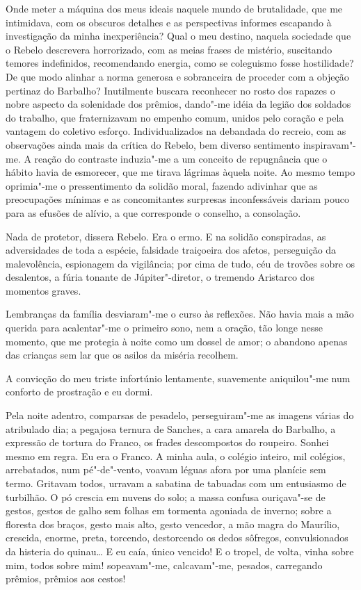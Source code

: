 Onde meter a máquina dos meus ideais naquele mundo de brutalidade, que me intimidava, 
com os obscuros detalhes e as perspectivas informes escapando à investigação da minha
inexperiência? Qual o meu destino, naquela sociedade que o Rebelo
descrevera horrorizado, com as meias frases de mistério, suscitando
temores indefinidos, recomendando energia, como se coleguismo fosse
hostilidade? De que modo alinhar a norma generosa e sobranceira de
proceder com a objeção pertinaz do Barbalho? Inutilmente buscara
reconhecer no rosto dos rapazes o nobre aspecto da solenidade dos
prêmios, dando"-me idéia da legião dos soldados do trabalho, que
fraternizavam no empenho comum, unidos pelo coração e pela vantagem do
coletivo esforço. Individualizados na debandada do recreio, com as
observações ainda mais da crítica do Rebelo, bem diverso sentimento
inspiravam"-me. A reação do contraste induzia"-me a um conceito de
repugnância que o hábito havia de esmorecer, que me tirava lágrimas
àquela noite. Ao mesmo tempo oprimia"-me o pressentimento da solidão
moral, fazendo adivinhar que as preocupações mínimas e as concomitantes
surpresas inconfessáveis dariam pouco para as efusões de alívio, a que
corresponde o conselho, a consolação. 

Nada de protetor, dissera Rebelo.
Era o ermo. E na solidão conspiradas, as adversidades de toda a
espécie, falsidade traiçoeira dos afetos, perseguição da malevolência,
espionagem da vigilância; por cima de tudo, céu de trovões sobre os
desalentos, a fúria tonante de Júpiter"-diretor, o tremendo Aristarco
dos momentos graves. 

Lembranças da família desviaram"-me o curso às
reflexões. Não havia mais a mão querida para acalentar"-me o primeiro
sono, nem a oração, tão longe nesse momento, que me protegia à noite
como um dossel de amor; o abandono apenas das crianças sem lar que os
asilos da miséria recolhem. 

A convicção do meu triste infortúnio lentamente, suavemente 
aniquilou"-me num conforto de prostração e eu dormi. 

Pela noite adentro, comparsas de pesadelo, perseguiram"-me as
imagens várias do atribulado dia; a pegajosa ternura de Sanches, a cara
amarela do Barbalho, a expressão de tortura do Franco, os frades
descompostos do roupeiro. Sonhei mesmo em regra. Eu era o Franco. A
minha aula, o colégio inteiro, mil colégios, arrebatados, num
pé"-de"-vento, voavam léguas afora por uma planície sem termo.
Gritavam todos, urravam a sabatina de tabuadas com um entusiasmo de
turbilhão. O pó crescia em nuvens do solo; a massa confusa
ouriçava"-se de gestos, gestos de galho sem folhas em tormenta
agoniada de inverno; sobre a floresta dos braços, gesto mais alto,
gesto vencedor, a mão magra do Maurílio, crescida, enorme, preta,
torcendo, destorcendo os dedos sôfregos, convulsionados da histeria do
quinau\ldots{} E eu caía, único vencido! E o tropel, de volta, vinha sobre
mim, todos sobre mim! sopeavam"-me, calcavam"-me, pesados, carregando
prêmios, prêmios aos cestos! 

